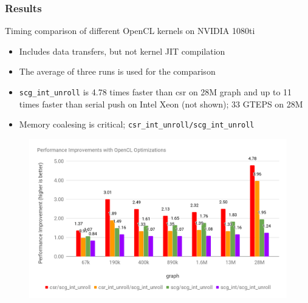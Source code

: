 \documentclass{beamer}
\begin{document}
\begin{frame}
  \frametitle{Results}
  Timing comparison of different OpenCL kernels on NVIDIA 1080ti
  \begin{itemize}
    \item Includes data transfers, but not kernel JIT compilation
    \item The average of three runs is used for the comparison
    \item \texttt{scg\_int\_unroll} is 4.78 times faster than csr on 28M graph and up to 
      11 times faster than serial push on Intel Xeon (not shown); 33 GTEPS on 28M
    \item Memory coalesing is critical; \texttt{csr\_int\_unroll/scg\_int\_unroll}
  \end{itemize}
  \begin{figure}
    \centering
    \includegraphics[width=.7\textwidth]{results/bfsNoPush.png}
  \end{figure}  
\end{frame}
\end{document}
